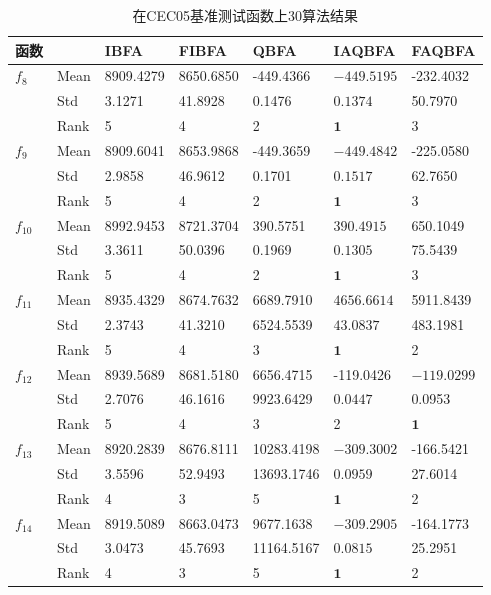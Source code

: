 \begin{table*}[htb]
\caption{在CEC05基准测试函数上30算法结果}
\vspace{0.5em}\centering
\begin{tabularx}{0.95\textwidth}{p{1cm}p{1cm}p{1.6cm}p{1.5cm}p{1.75cm}p{1.75cm}p{1.5cm}}
\hline
函数&  &  IBFA &  FIBFA&  QBFA&  IAQBFA &FAQBFA\\
\midrule
$f_8$&  Mean &8909.4279       &8650.6850   & -449.4366  &$\bm{-449.5195}$   & -232.4032\\
 &  Std&  3.1271      &41.8928     &  0.1476     & $\bm{0.1374}$  &50.7970\\
 &  Rank&5    &4   & 2  & $\bm{1}$&3 \\
$f_{9}$&  Mean   &8909.6041   &8653.9868  &-449.3659  &$\bm{-449.4842}$  &-225.0580\\
 &  Std&2.9858   &46.9612  & 0.1701   & $\bm{0.1517}$  &62.7650\\
 &  Rank&5   &4  &2   &$\bm{1}$  &3   \\
$f_{10}$&  Mean&8992.9453   &8721.3704   & 390.5751    &$\bm{390.4915}$   &650.1049\\
 &  Std&3.3611   &50.0396  & 0.1969 &$\bm{0.1305}$   &75.5439\\
 &  Rank&5   & 4  &2& $\bm{1}$ &3  \\
$f_{11}$&  Mean&8935.4329   &8674.7632   &6689.7910   &$\bm{4656.6614}$   &5911.8439\\
 &  Std&2.3743   &41.3210  &6524.5539   &$\bm{43.0837}$   &483.1981\\
 &  Rank&5  &4   & 3   & $\bm{1}$  &2   \\
$f_{12}$&  Mean&8939.5689&8681.5180   & 6656.4715   &-119.0426   &$\bm{-119.0299}$\\
 &  Std&2.7076   &46.1616  &9923.6429  &$\bm{0.0447}$   &0.0953\\
 &  Rank&5   &4  &3   &2   &$\bm{1}$    \\
$f_{13}$&  Mean&8920.2839   &8676.8111   &10283.4198   &$\bm{-309.3002}$    &-166.5421\\
 &  Std&3.5596   &52.9493  & 13693.1746  &$\bm{0.0959}$   &27.6014\\
 &  Rank&4   & 3  & 5   &$\bm{1}$  &2   \\
$f_{14}$&  Mean&8919.5089   &8663.0473   &9677.1638  &$\bm{-309.2905}$  &-164.1773\\
 &  Std&3.0473  &45.7693  &11164.5167 &$\bm{0.0815}$   &25.2951\\
 &  Rank&4   &3  &5   &$\bm{1}$   &2 \\
\hline
\end{tabularx}
\label{tab:CEC05results}
\end{table*}

